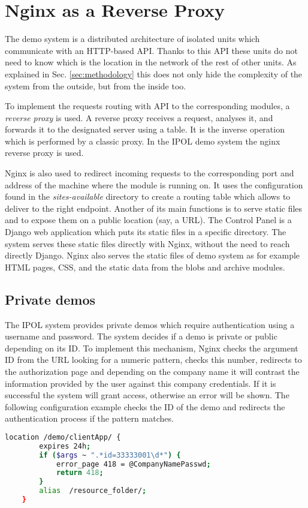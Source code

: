 
\section{Nginx as a Reverse Proxy}
\label{sec:reverse_proxy}

The demo system is a distributed architecture of isolated units which communicate with an HTTP-based API. Thanks to this API these
units do not need to know which is the location in the network of the rest of other units. As explained in Sec. \ref{sec:methodology} this
does not only hide the complexity of the system from the outside, but from the inside too.

To implement the requests routing with API to the corresponding modules, a \emph{reverse proxy} is used. A reverse proxy receives a
request, analyses it, and forwards it to the designated server using a table. It is the inverse operation which is performed by a
classic proxy. In the IPOL demo system the nginx reverse proxy is used.

Nginx is also used to redirect incoming requests to the corresponding port and address of the machine where the module is 
running on. It uses the configuration found in the \emph{sites-available} directory to create a routing table which allows to deliver to the right endpoint.
Another of its main functions is to serve static files and to expose them on a public location (say, a URL). The Control Panel is a Django web application which puts its static files in a specific directory. 
The system serves these static files directly with Nginx, without the need to reach directly Django. Nginx also serves the static files of demo system as for example HTML pages, CSS, and the static data from the blobs and archive modules.

\subsection{Private demos}
The IPOL system provides private demos which require authentication using a username and password. The system decides if a demo is private or public depending on its ID. To implement this mechanism, Nginx checks the argument ID from the URL looking for a numeric pattern, checks this number, redirects to the authorization page and depending on the company name it will contrast the information provided by the user against this company credentials. If it
is successful the system will grant access, otherwise an error will be shown. The following configuration example checks the ID of the
demo and redirects the authentication process if the pattern matches. 

\begin{lstlisting}[language=Bash]
location /demo/clientApp/ {
        expires 24h;
        if ($args ~ ".*id=33333001\d*") {
            error_page 418 = @CompanyNamePasswd;
            return 418;
        }
        alias  /resource_folder/;
    }
 \end{lstlisting}

